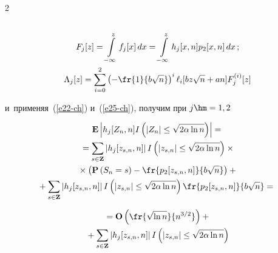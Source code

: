 \begin{multicols}{2}
\begin{gather}
\notag\\


F_j[z]=\int\limits_{-\infty}^z f_j[x] \,dx


 =\int\limits_{-\infty}^z h_j[x,n] p_2[x,n]\, dx\,;


\label{e26-ch}\\


\Lambda_j[z]=\sum\limits_{i=0}^2 \left(-\fr{1}{b\sqrt{n}}\right)^i


 \ell_i[bz\sqrt{n}+an]F_j^{(i)}[z]


 \label{e27-ch}


 \end{gather}


 и~применяя~(\ref{e22-ch}) и~(\ref{e25-ch}), получим при $j\hm=1,2$


 \begin{multline*}


 \mathbf{E}\left|h_j[Z_n,n]I\left( |Z_n|\le \sqrt {2\alpha \ln n}\right)\right|={}


 \\


 {} =\sum\limits_{s\in \mathbf{Z}}


 \left|h_j[z_{s,n},n]\right| I\left( |z_{s,n}|\le \sqrt {2\alpha \ln n}\right)


\times{}\\


{}\times \left(\mathbf{P}\left(S_n=s\right)-\fr{p_2[z_{s,n},n]}{b\sqrt{n}}\right)+{}\\


\hspace*{-2.92pt}{}+ \sum\limits_{s\in \mathbf{Z}}


 \left|h_j[z_{s,n},n]\right| I\left( |z_{s,n}|\le \sqrt {2\alpha \ln n}\right)


 \fr{p_2[z_{s,n},n]}{b\sqrt{n}}={}


\end{multline*}





\noindent


\begin{multline}


 {}=\mathbf{O}\left(\fr{\sqrt{\ln n}} {n^{3/2}}\right)


 + {}\\


 {}+\sum\limits_{s\in \mathbf{Z}}


 \left|h_j[z_{s,n},n]\right| I\left( |z_{s,n}|\le \sqrt {2\alpha \ln n}\right)



\end{multline}
\end{multicols}
